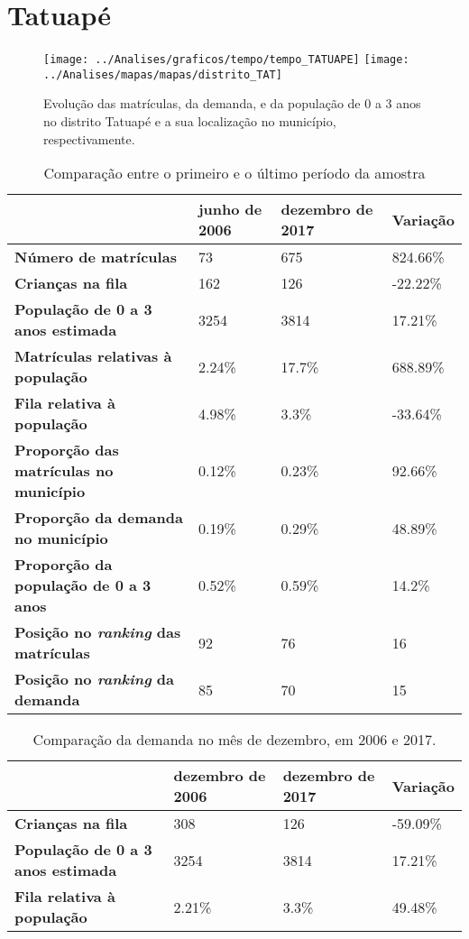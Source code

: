 \section{Tatuapé}
\begin{figure}[H]
\centering
\texttt{[image: ../Analises/graficos/tempo/tempo\_TATUAPE]}
\texttt{[image: ../Analises/mapas/mapas/distrito\_TAT]}
\caption{Evolução das matrículas, da demanda, e da população de 0 a 3 anos no distrito Tatuapé e a sua localização no município, respectivamente.}
\end{figure}
\begin{table}[H]
\begin{tabular}{l|l|l|l}
\textbf{}                                      & \textbf{junho de 2006}       & \textbf{dezembro de 2017}    & \textbf{Variação} \\ \hline
\textbf{Número de matrículas}                  & 73 & 675 & 824.66\% \\ \hline
\textbf{Crianças na fila}                      & 162 & 126 & -22.22\% \\ \hline
\textbf{População de 0 a 3 anos estimada}      & 3254 & 3814 & 17.21\% \\ \hline
\textbf{Matrículas relativas à população}      & 2.24\% & 17.7\% & 688.89\% \\ \hline
\textbf{Fila relativa à população}             & 4.98\% & 3.3\% & -33.64\% \\ \hline
\textbf{Proporção das matrículas no município} & 0.12\% & 0.23\% & 92.66\% \\ \hline
\textbf{Proporção da demanda no município}     & 0.19\% & 0.29\% & 48.89\% \\ \hline
\textbf{Proporção da população de 0 a 3 anos}  & 0.52\% & 0.59\% & 14.2\% \\ \hline
\textbf{Posição no \textit{ranking} das matrículas}     & 92 & 76 & 16 \\ \hline
\textbf{Posição no \textit{ranking} da demanda}         & 85 & 70 & 15 \\ 
\end{tabular}
\caption{Comparação entre o primeiro e o último período da amostra}
\end{table}
\begin{table}[H]
\begin{tabular}{l|l|l|l}
\textbf{}                                 & \textbf{dezembro de 2006} & \textbf{dezembro de 2017} & \textbf{Variação} \\ \hline
\textbf{Crianças na fila}                      & 308 & 126 & -59.09\% \\ \hline
\textbf{População de 0 a 3 anos estimada}      & 3254 & 3814 & 17.21\% \\ \hline
\textbf{Fila relativa à população}             & 2.21\% & 3.3\% & 49.48\% \\
\end{tabular}
\caption{Comparação da demanda no mês de dezembro, em 2006 e 2017.}
\end{table}
